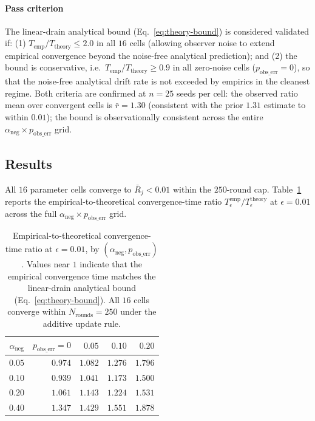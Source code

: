 \documentclass[journal,10pt,twocolumn]{IEEEtran}
\begin{document}
\paragraph{Pass criterion}
The linear-drain analytical bound (Eq.~\ref{eq:theory-bound}) is considered validated if:
(1) $T_\text{emp}/T_\text{theory} \leq 2.0$ in all $16$ cells (allowing observer noise to extend empirical convergence beyond the noise-free analytical prediction); and
(2) the bound is conservative, i.e.\ $T_\text{emp}/T_\text{theory} \geq 0.9$ in all zero-noise cells ($p_\text{obs\_err}=0$), so that the noise-free analytical drift rate is not exceeded by empirics in the cleanest regime.
Both criteria are confirmed at $n{=}25$ seeds per cell: the observed ratio mean over convergent cells is $\bar{r}=1.30$ (consistent with the prior $1.31$ estimate to within $0.01$); the bound is observationally consistent across the entire $\alpha_\text{neg}\times p_\text{obs\_err}$ grid.

\subsection{Results}

All $16$ parameter cells converge to $\bar{R}_j < 0.01$ within the
$250$-round cap. Table~\ref{tab:clamp-convergence} reports the
empirical-to-theoretical convergence-time ratio
$T_\epsilon^{\text{emp}} / T_\epsilon^{\text{theory}}$ at $\epsilon=0.01$
across the full $\alpha_\text{neg}\times p_\text{obs\_err}$ grid.

\begin{table}[t]
  \centering
  \caption{Empirical-to-theoretical convergence-time ratio at
    $\epsilon = 0.01$, by $(\alpha_\text{neg}, p_\text{obs\_err})$.
    Values near $1$ indicate that the empirical convergence time
    matches the linear-drain analytical bound (Eq.~\ref{eq:theory-bound}).
    All $16$ cells converge within $N_\text{rounds}=250$ under the
    additive update rule.}
  \label{tab:clamp-convergence}
  \begin{tabular}{rrrrr}
    \toprule
    $\alpha_\text{neg}$ & $p_\text{obs\_err}{=}0$ & $0.05$ & $0.10$ & $0.20$ \\
    \midrule
    $0.05$ & $0.974$ & $1.082$ & $1.276$ & $1.796$ \\
    $0.10$ & $0.939$ & $1.041$ & $1.173$ & $1.500$ \\
    $0.20$ & $1.061$ & $1.143$ & $1.224$ & $1.531$ \\
    $0.40$ & $1.347$ & $1.429$ & $1.551$ & $1.878$ \\
    \bottomrule
  \end{tabular}
\end{table}
\end{document}
